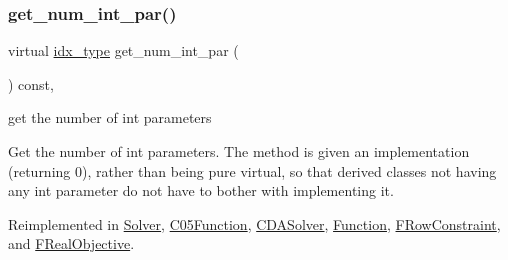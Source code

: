 \mbox{\label{class_s_m_spp__di__unipi__it_1_1_thin_compute_interface_a1e009f6b43f7966bf4b4740e0b4cff58}} 
\subsubsection{\texorpdfstring{get\+\_\+num\+\_\+int\+\_\+par()}{get\_num\_int\_par()}}
{\footnotesize\ttfamily virtual \mbox{\hyperlink{class_s_m_spp__di__unipi__it_1_1_thin_compute_interface_aa3d710629ad8c434286726ad810c3b47}{idx\+\_\+type}} get\+\_\+num\+\_\+int\+\_\+par (\begin{DoxyParamCaption}\item[{void}]{ }\end{DoxyParamCaption}) const\hspace{0.3cm}{\ttfamily [inline]}, {\ttfamily [virtual]}}



get the number of int parameters 

Get the number of int parameters. The method is given an implementation (returning 0), rather than being pure virtual, so that derived classes not having any int parameter do not have to bother with implementing it. 

Reimplemented in \mbox{\hyperlink{class_s_m_spp__di__unipi__it_1_1_solver_a3ad74d9506761eb2ca4c8a936fb7a1c5}{Solver}}, \mbox{\hyperlink{class_s_m_spp__di__unipi__it_1_1_c05_function_a3ad74d9506761eb2ca4c8a936fb7a1c5}{C05\+Function}}, \mbox{\hyperlink{class_s_m_spp__di__unipi__it_1_1_c_d_a_solver_a3ad74d9506761eb2ca4c8a936fb7a1c5}{C\+D\+A\+Solver}}, \mbox{\hyperlink{class_s_m_spp__di__unipi__it_1_1_function_a3ad74d9506761eb2ca4c8a936fb7a1c5}{Function}}, \mbox{\hyperlink{class_s_m_spp__di__unipi__it_1_1_f_row_constraint_a3ad74d9506761eb2ca4c8a936fb7a1c5}{F\+Row\+Constraint}}, and \mbox{\hyperlink{class_s_m_spp__di__unipi__it_1_1_f_real_objective_a3ad74d9506761eb2ca4c8a936fb7a1c5}{F\+Real\+Objective}}.

\mbox{\label{class_s_m_spp__di__unipi__it_1_1_thin_compute_interface_a23ef8ba7477625aec4a54dddff053468}} 
